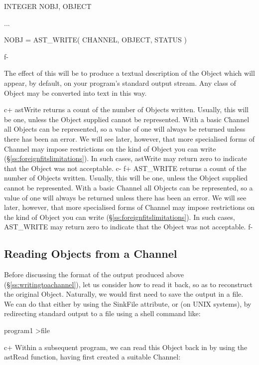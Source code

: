 \documentclass[twoside,11pt]{starlink}
\providecommand{\secref}[1]{\S\ref{#1}}
\begin{document}
{\small
\begin{terminalv}
      INTEGER NOBJ, OBJECT

      ...

      NOBJ = AST_WRITE( CHANNEL, OBJECT, STATUS )
\end{terminalv}
\normalsize
f-

The effect of this will be to produce a textual description of the
Object which will appear, by default, on your program's standard
output stream. Any class of Object may be converted into text in this
way.

c+
astWrite returns a count of the number of Objects written. Usually,
this will be one, unless the Object supplied cannot be
represented. With a basic Channel all Objects can be represented, so a
value of one will always be returned unless there has been an
error. We will see later, however, that more specialised forms of
Channel may impose restrictions on the kind of Object you can write
(\secref{ss:foreignfitslimitations}). In such cases, astWrite may
return zero to indicate that the Object was not acceptable.
c-
f+
AST\_WRITE returns a count of the number of Objects written. Usually,
this will be one, unless the Object supplied cannot be
represented. With a basic Channel all Objects can be represented, so a
value of one will always be returned unless there has been an
error. We will see later, however, that more specialised forms of
Channel may impose restrictions on the kind of Object you can write
(\secref{ss:foreignfitslimitations}). In such cases, AST\_WRITE may
return zero to indicate that the Object was not acceptable.
f-

\subsection{\label{ss:readingfromachannel}Reading Objects from a Channel}

Before discussing the format of the output produced above
(\secref{ss:writingtoachannel}), let us consider how to read it back,
so as to reconstruct the original Object. Naturally, we would first
need to save the output in a file. We can do that either by using the
SinkFile attribute, or (on UNIX systems), by redirecting standard output
to a file using a shell command like:

\small
\begin{terminalv}
program1 >file
\end{terminalv}
\normalsize

c+
Within a subsequent program, we can read this Object back in by
using the astRead function, having first created a suitable
Channel:

}
\end{document}

